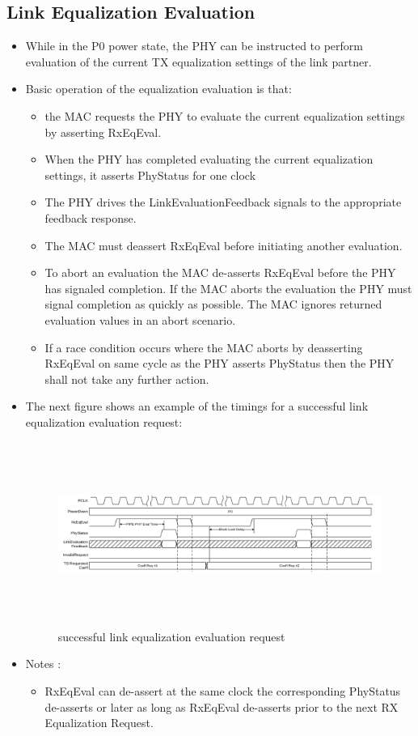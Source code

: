 \subsection{Link Equalization Evaluation} 
\begin{itemize}
    \item While in the P0 power state, the PHY can be instructed to perform evaluation of the current TX equalization settings of the link partner.
    \item Basic operation of the equalization evaluation is that:
\begin{itemize}
    \item the MAC requests the PHY to evaluate the current equalization settings by asserting RxEqEval.
    \item When the PHY has completed evaluating the current equalization settings, it asserts PhyStatus for one clock

    \item The PHY drives the LinkEvaluationFeedback signals to the appropriate feedback response.

    \item The MAC must deassert RxEqEval before initiating another evaluation.

    \item To abort an evaluation the MAC de-asserts RxEqEval before the PHY has signaled completion. If the MAC aborts the evaluation the PHY must signal completion as quickly as possible. The MAC ignores returned evaluation values in an abort scenario.
\item If a race condition occurs where the MAC aborts by deasserting RxEqEval on same cycle as the PHY asserts PhyStatus then the PHY shall not take any further action.


\end{itemize}
\item The next figure shows an example of the timings for a successful link equalization evaluation request:
\begin{figure}[H]
  \centering
  \includegraphics[width=130mm,height=60mm]{images/clk_diagram/eq.png}
  \caption{successful link equalization evaluation request}
  \label{lane}
\end{figure}
\item Notes :
\begin{itemize}
    \item RxEqEval can de-assert at the same clock the corresponding PhyStatus de-asserts or later as long as RxEqEval de-asserts prior to the next RX Equalization Request.


\end{itemize}
\end{itemize}
